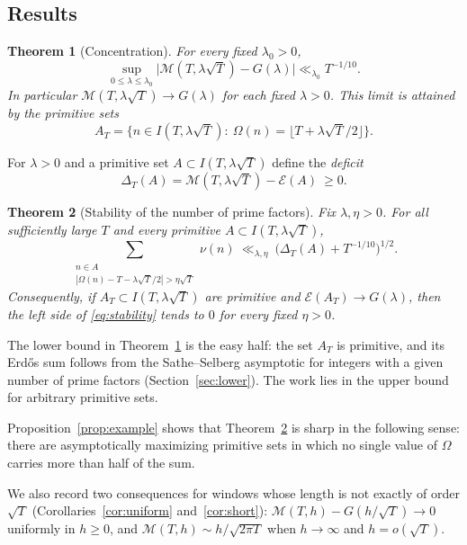 \documentclass[11pt,a4paper]{article}
\numberwithin{equation}{section}
\theoremstyle{plain}
\newtheorem{theorem}{Theorem}[section]
\theoremstyle{definition}
\theoremstyle{remark}
\newcommand{\cE}{\mathcal{E}}
\newcommand{\cM}{\mathcal{M}}
\begin{document}
\subsection{Results}

\begin{theorem}[Concentration]\label{thm:main}
For every fixed $\lambda_0>0$,
\begin{equation}\label{eq:main}
\sup_{0\le\lambda\le\lambda_0}\bigl|\cM(T,\lambda\sqrt T)-G(\lambda)\bigr|\ll_{\lambda_0}T^{-1/10}.
\end{equation}
In particular $\cM(T,\lambda\sqrt T)\to G(\lambda)$ for each fixed $\lambda>0$. This limit is attained by the primitive sets
\[
A_T=\bigl\{n\in I(T,\lambda\sqrt T):\ \Omega(n)=\lfloor T+\lambda\sqrt T/2\rfloor\bigr\}.
\]
\end{theorem}

For $\lambda>0$ and a primitive set $A\subset I(T,\lambda\sqrt T)$ define the \emph{deficit}
\[
\Delta_T(A)=\cM(T,\lambda\sqrt T)-\cE(A)\ \ge0 .
\]

\begin{theorem}[Stability of the number of prime factors]\label{thm:stability}
Fix $\lambda,\eta>0$. For all sufficiently large $T$ and every primitive $A\subset I(T,\lambda\sqrt T)$,
\begin{equation}\label{eq:stability}
\sum_{\substack{n\in A\\ |\Omega(n)-T-\lambda\sqrt T/2|>\eta\sqrt T}}\nu(n)\ \ll_{\lambda,\eta}\ \bigl(\Delta_T(A)+T^{-1/10}\bigr)^{1/2}.
\end{equation}
Consequently, if $A_T\subset I(T,\lambda\sqrt T)$ are primitive and $\cE(A_T)\to G(\lambda)$, then the left side of \eqref{eq:stability} tends to $0$ for every fixed $\eta>0$.
\end{theorem}

The lower bound in Theorem~\ref{thm:main} is the easy half: the set $A_T$ is primitive, and its Erd\H{o}s sum follows from the Sathe--Selberg asymptotic for integers with a given number of prime factors (Section~\ref{sec:lower}). The work lies in the upper bound for arbitrary primitive sets.

Proposition~\ref{prop:example} shows that Theorem~\ref{thm:stability} is sharp in the following sense: there are asymptotically maximizing primitive sets in which no single value of $\Omega$ carries more than half of the sum.

We also record two consequences for windows whose length is not exactly of order $\sqrt T$ (Corollaries~\ref{cor:uniform} and~\ref{cor:short}): $\cM(T,h)-G(h/\sqrt T)\to0$ uniformly in $h\ge0$, and $\cM(T,h)\sim h/\sqrt{2\pi T}$ when $h\to\infty$ and $h=o(\sqrt T)$.
\end{document}
